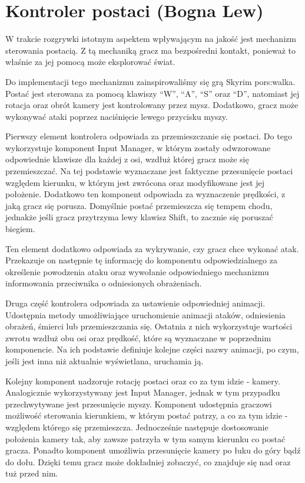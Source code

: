 \section{Kontroler postaci (Bogna Lew)}
W trakcie rozgrywki istotnym aspektem wpływającym na jakość jest mechanizm sterowania postacią. Z tą mechaniką gracz ma
bezpośredni kontakt, ponieważ to właśnie za jej pomocą może eksplorować świat.

Do implementacji tego mechanizmu zainspirowaliśmy się grą Skyrim por{s:walka}. Postać jest sterowana za pomocą klawiszy “W”, “A”, “S”
oraz “D”, natomiast jej rotacja oraz obrót kamery jest kontrolowany przez mysz. Dodatkowo, gracz może wykonywać ataki
poprzez naciśnięcie lewego przycisku myszy.

Pierwszy element kontrolera odpowiada za przemieszczanie się postaci. Do tego wykorzystuje komponent Input Manager, w
którym zostały odwzorowane odpowiednie klawisze dla każdej z osi, wzdłuż której gracz może się przemieszczać. Na tej
podstawie wyznaczane jest faktyczne przesunięcie postaci względem kierunku, w którym jest zwrócona oraz modyfikowane
jest jej położenie. Dodatkowo ten komponent odpowiada za wyznaczenie prędkości, z jaką gracz się porusza. Domyślnie
postać przemieszcza się tempem chodu, jednakże jeśli gracz przytrzyma lewy klawisz Shift, to zacznie się poruszać biegiem.

Ten element dodatkowo odpowiada za wykrywanie, czy gracz chce wykonać atak. Przekazuje on następnie tę informację do
komponentu odpowiedzialnego za określenie powodzenia ataku oraz wywołanie odpowiedniego mechanizmu informowania
przeciwnika o odniesionych obrażeniach.

Druga część kontrolera odpowiada za ustawienie odpowiedniej animacji. Udostępnia metody umożliwiające uruchomienie
animacji ataków, odniesienia obrażeń, śmierci lub przemieszczania się. Ostatnia z nich wykorzystuje wartości zwrotu wzdłuż
obu osi oraz prędkość, które są wyznaczane w poprzednim komponencie. Na ich podstawie definiuje kolejne części nazwy
animacji, po czym, jeśli jest inna niż aktualnie wyświetlana, uruchamia ją.

Kolejny komponent nadzoruje rotację postaci oraz co za tym idzie - kamery. Analogicznie wykorzystywany jest Input
Manager, jednak w tym przypadku przechwytywane jest przesunięcie myszy. Komponent udostępnia graczowi możliwość
sterowania kierunkiem, w którym postać patrzy, a co za tym idzie - względem którego się przemieszcza. Jednocześnie
następuje dostosowanie położenia kamery tak, aby zawsze patrzyła w tym samym kierunku co postać gracza. Ponadto
komponent umożliwia przesunięcie kamery po łuku do góry bądź do dołu. Dzięki temu gracz może dokładniej zobaczyć,
co znajduje się nad oraz tuż przed nim.

